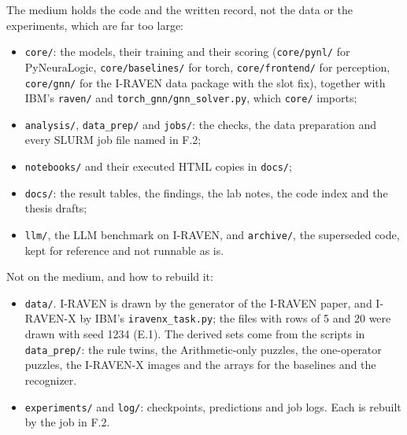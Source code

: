 The medium holds the code and the written record, not the data or the experiments, which are far too large:

\begin{itemize}
\item \texttt{core/}: the models, their training and their scoring (\texttt{core/pynl/} for PyNeuraLogic, \texttt{core/baselines/} for torch, \texttt{core/frontend/} for perception, \texttt{core/gnn/} for the I-RAVEN data package with the slot fix), together with IBM's \texttt{raven/} and \texttt{torch\_gnn/gnn\_solver.py}, which \texttt{core/} imports;
\item \texttt{analysis/}, \texttt{data\_prep/} and \texttt{jobs/}: the checks, the data preparation and every SLURM job file named in F.2;
\item \texttt{notebooks/} and their executed HTML copies in \texttt{docs/};
\item \texttt{docs/}: the result tables, the findings, the lab notes, the code index and the thesis drafts;
\item \texttt{llm/}, the LLM benchmark on I-RAVEN, and \texttt{archive/}, the superseded code, kept for reference and not runnable as is.
\end{itemize}

Not on the medium, and how to rebuild it:

\begin{itemize}
\item \texttt{data/}. I-RAVEN is drawn by the generator of the I-RAVEN paper, and I-RAVEN-X by IBM's \texttt{iravenx\_task.py}; the files with rows of 5 and 20 were drawn with seed 1234 (E.1). The derived sets come from the scripts in \texttt{data\_prep/}: the rule twins, the Arithmetic-only puzzles, the one-operator puzzles, the I-RAVEN-X images and the arrays for the baselines and the recognizer.
\item \texttt{experiments/} and \texttt{log/}: checkpoints, predictions and job logs. Each is rebuilt by the job in F.2.
\end{itemize}

